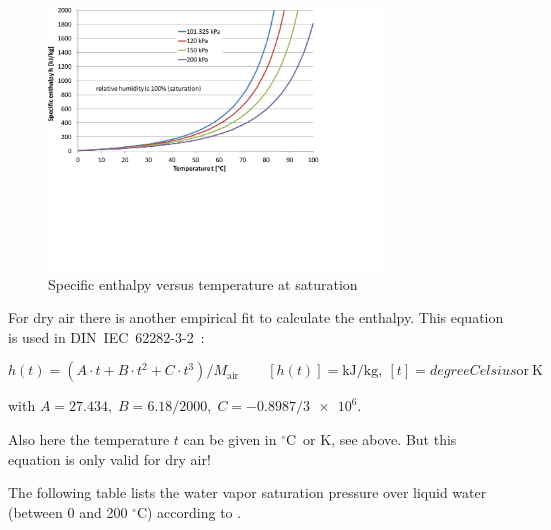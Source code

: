 \documentclass[11pt,a4paper,english,twoside]{scrreprt}
\newcommand{\gradC}{${}^\circ$C}      %
\begin{document}
\begin{figure}
  \centering
  \includegraphics*[width=0.8\textwidth,angle=0]{FCF_Diag_h2.pdf}
  \caption[Specific enthalpy versus temperature at saturation]{Specific enthalpy versus temperature at saturation}
\end{figure}


For dry air there is another empirical fit to calculate the enthalpy. This equation is used in DIN~IEC~62282-3-2~\cite{DIN_62282-3-2}:

\[
h(t)=(A\cdot t+B\cdot t^2 +C\cdot t^3 )/M_\text{air} \qquad [h(t)] = \si{\kilo\joule\per\kilogram},\ [t] = \si{degreeCelsius} \mbox{or}\ \si{\kelvin}
\]

with $A = \num{27.434},\; B = \num{6.18}/\num{2000},\; C = \num{-0.8987}/\num{3e6}$.

Also here the temperature $t$ can be given in \gradC\ or K, see above. But this equation is only valid for dry air!

\newpage

The following table lists the water vapor saturation pressure over liquid water (between 0 and 200 \gradC) according to \cite{HCP}.
\end{document}
